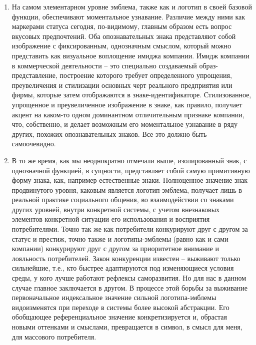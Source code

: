 \begin{enumerate}
\item На самом элементарном уровне эмблема, также как и логотип в
  своей базовой функции, обеспечивают моментальное узнавание. Различие
  между ними как маркерами статуса сегодня, по-видимому, главным образом
  есть вопрос вкусовых предпочтений. Оба опознавательных знака представляют
  собой изображение с фиксированным, однозначным смыслом, который можно представить
  как визуальное воплощение имиджа компании. Имидж компании  в коммерческой
  деятельности -- это специально создаваемый образ-представление, построение
  которого требует определенного упрощения, преувеличения и стилизации основных
  черт реального предприятия или фирмы, которые затем отображаются в знаке-идентификаторе.
  Стилизованное, упрощенное и преувеличенное изображение в знаке, как правило, получает
  акцент на каком-то одном доминантном отличительным признаке компании, что, собственно,
  и делает возможным его моментальное узнавание в ряду других, похожих опознавательных
  знаков.\autocite{raigorodski2001}\autocite{melnik2001}\autocite[][88-99]{karasik2011} Все это должно быть самоочевидно.
\item В то же время, как мы неоднократно отмечали выше, изолированный знак, с
  однозначной функцией, в сущности, представляет собой самую примитивную форму знака,
  как, например естественные знаки. Полноценное значение знак продвинутого уровня,
  каковым является логотип-эмблема, получает лишь в реальной практике социального общения,
  во взаимодействии со знаками других уровней, внутри конкретной системы,
  с учетом внезнаковых элементов конкретной ситуации его использования и восприятия
  потребителями. Точно так же как потребители конкурируют друг с другом за статус
  и престиж, точно также и логотипы-эмблемы (равно как и сами компании) конкурируют
  друг с другом за приоритетное внимание и лояльность потребителей. Закон конкуренции
  известен -- выживают только сильнейшие, т.е., кто быстрее адаптируются под
  изменяющиеся условия среды, у кого лучше работают рефлексы саморазвития.\autocite{simonov1987}
  Но для нас в данном случае главное заключается в другом. В процессе этой борьбы
  за выживание первоначальное индексальное значение сильной логотипа-эмблемы
  видоизменятся при переходе в системы более высокой абстракции. Его обобщающее
  референциальное значение конкретизируется и, обрастая новыми оттенками и смыслами,
  превращается в символ, в смысл для меня, для массового потребителя.
\end{enumerate}

